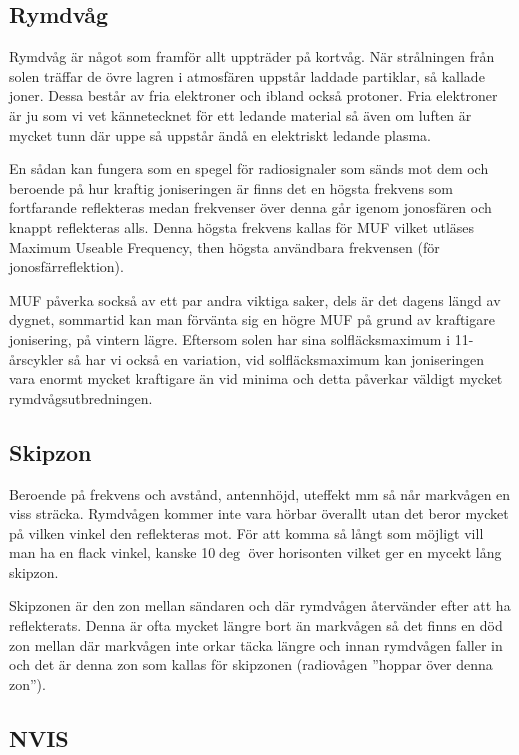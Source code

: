 \subsection{Rymdvåg}

Rymdvåg är något som framför allt uppträder på kortvåg. När strålningen från
solen träffar de övre lagren i atmosfären uppstår laddade partiklar, så
kallade joner. Dessa består av fria elektroner och ibland också protoner. Fria
elektroner är ju som vi vet kännetecknet för ett ledande material så även om
luften är mycket tunn där uppe så uppstår ändå en elektriskt ledande plasma.

En sådan kan fungera som en spegel för radiosignaler som sänds mot dem och
beroende på hur kraftig joniseringen är finns det en högsta frekvens som
fortfarande reflekteras medan frekvenser över denna går igenom jonosfären och
knappt reflekteras alls. Denna högsta frekvens kallas för MUF vilket utläses
Maximum Useable Frequency, then högsta användbara frekvensen (för
jonosfärreflektion).

MUF påverka sockså av ett par andra viktiga saker, dels är det dagens längd av
dygnet, sommartid kan man förvänta sig en högre MUF på grund av kraftigare
jonisering, på vintern lägre. Eftersom solen har sina solfläcksmaximum i
11-årscykler så har vi också en variation, vid solfläcksmaximum kan
joniseringen vara enormt mycket kraftigare än vid minima och detta påverkar
väldigt mycket rymdvågsutbredningen.

\subsection{Skipzon}

Beroende på frekvens och avstånd, antennhöjd, uteffekt mm så når markvågen en
viss sträcka. Rymdvågen kommer inte vara hörbar överallt utan det beror mycket
på vilken vinkel den reflekteras mot. För att komma så långt som möjligt vill
man ha en flack vinkel, kanske 10$\deg$ över horisonten vilket ger en mycekt
lång skipzon.

Skipzonen är den zon mellan sändaren och där rymdvågen återvänder efter att ha
reflekterats. Denna är ofta mycket längre bort än markvågen så det finns en
död zon mellan där markvågen inte orkar täcka längre och innan rymdvågen
faller in och det är denna zon som kallas för skipzonen (radiovågen ''hoppar
över denna zon'').

\subsection{NVIS}


